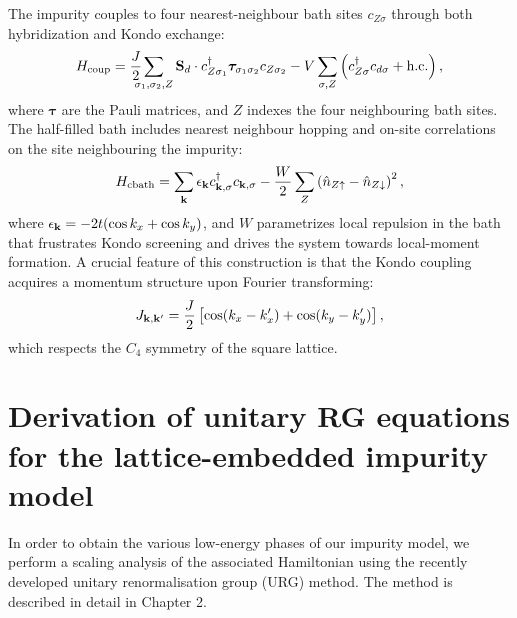 The impurity couples to four nearest-neighbour bath sites $c_{Z\sigma}$ through both hybridization and Kondo exchange:
\begin{equation}\begin{aligned}
H_\text{coup} = \frac{J}{2} \hspace{-0.25cm}\sum_{\sigma_1,\sigma_2,Z} 
{\bf S}_d \cdot c^\dagger_{Z\sigma_1} {\boldsymbol \tau}_{\sigma_1 \sigma_2} c_{Z\sigma_2} 
- V \sum_{\sigma,Z} \left( c^\dagger_{Z\sigma} c_{d\sigma} + \text{h.c.} \right),    
\end{aligned}
\label{impbathcoup}\end{equation}
where ${\boldsymbol \tau}$ are the Pauli matrices, and $Z$ indexes the four neighbouring bath sites. The half-filled bath includes nearest neighbour hopping and on-site correlations on the site neighbouring the impurity:
\begin{equation}
H_\text{cbath} = \sum_{\bf k} \epsilon_{\bf k} c^\dagger_{{\bf k},\sigma} c_{{\bf k},\sigma} - \frac{W}{2} \sum_{Z} \left( \hat{n}_{Z\uparrow} - \hat{n}_{Z\downarrow} \right)^2,
\label{bathke}
\end{equation}
where $\epsilon_{\bf k} = -2t(\cos k_x + \cos k_y)$, and $W$ parametrizes local repulsion in the bath that frustrates Kondo screening and drives the system towards local-moment formation. A crucial feature of this construction is that the Kondo coupling acquires a momentum structure upon Fourier transforming:
\begin{equation}
J_{{\bf k}, {\bf k}^\prime} = \frac{J}{2} \left[ \cos(k_x - k^\prime_x) + \cos(k_y - k^\prime_y) \right],
\end{equation}
which respects the $C_4$ symmetry of the square lattice.

\section{Derivation of unitary RG equations for the lattice-embedded impurity model}\label{tileRG}
In order to obtain the various low-energy phases of our impurity model, we perform a scaling analysis of the associated Hamiltonian using the recently developed unitary renormalisation group (URG) method. The method is described in detail in Chapter 2. 
